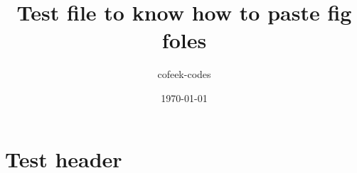 \documentclass[11pt]{article}
\author{cofeek-codes}
\date{\today}
\title{Test file to know how to paste fig foles}
\begin{document}
\maketitle
\tableofcontents


\section{Test header}
\label{sec:org755c239}
\end{document}
